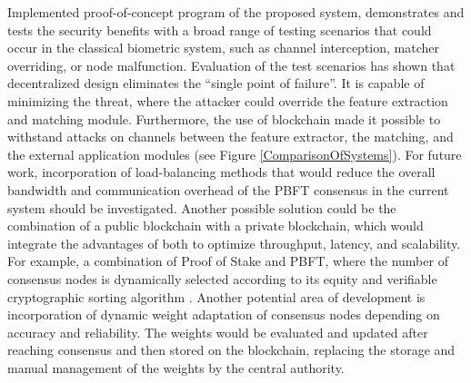 Implemented proof-of-concept program of the proposed system, demonstrates and tests the security benefits with a broad range of testing scenarios that could occur in the classical biometric system, such as channel interception, matcher overriding, or node malfunction. Evaluation of the test scenarios has shown that decentralized design eliminates the ``single point of failure''. It is capable of minimizing the threat, where the attacker could override the feature extraction and matching module. Furthermore, the use of blockchain made it possible to withstand attacks on channels between the feature extractor, the matching, and the external application modules (see Figure \ref{ComparisonOfSystems}).
For future work, incorporation of load-balancing methods that would reduce the overall bandwidth and communication overhead of the PBFT consensus in the current system should be investigated. Another possible solution could be the combination of a public blockchain with a private blockchain, which would integrate the advantages of both to optimize throughput, latency, and scalability. For example, a combination of Proof of Stake and PBFT, where the number of consensus nodes is dynamically selected according to its equity and verifiable cryptographic sorting algorithm \cite{HybridPoSPBFT}. Another potential area of development is incorporation of dynamic weight adaptation of consensus nodes depending on accuracy and reliability. The weights would be evaluated and updated after reaching consensus and then stored on the blockchain, replacing the storage and manual management of the weights by the central authority.